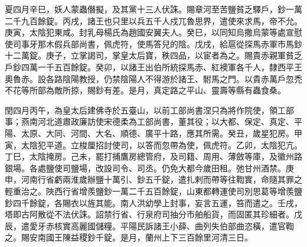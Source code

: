\begin{pinyinscope}
 夏四月辛巳，妖人蒙蟲僭擬，及其黨十三人伏誅。賜章河至苦鹽貧乏驛戶，鈔一萬二千九百餘錠。丙戌，諸王也只里以兵五千人戍兀魯思界，遣使來求馬，帝不允。庚寅，太陰犯東咸。封乳母楊氏為趙國安翼夫人。癸巳，以同知烏撒烏蒙等處宣慰使司事牙那木假兵部尚書，佩虎符，使馬答兒的陰。戊戌，給扈從探馬赤軍市馬鈔十二萬錠。庚子，立掌謁司，掌皇太后寶，秩四品，以宦者為之。賜貴赤親軍貧乏戶鈔四萬一千五百餘錠。癸卯，以諸王出伯所統探馬赤、紅襖軍各千人，隸西平王奧魯赤。設各路陰陽教授，仍禁陰陽人不得游於諸王、駙馬之門。以貴赤萬戶忽禿不花等所部為敵所掠，賜鈔有差。是月，真定路之平山、靈壽等縣有蟲食桑。



 閏四月丙午，為皇太后建佛寺於五臺山，以前工部尚書涅只為將作院使，領工部事；燕南河北道肅政廉訪使宋德柔為工部尚書，董其役；以大都、保定、真定、平陽、太原、大同、河間、大名、順德、廣平十路，應其所需。癸丑，歲星犯房。甲寅，太陰犯平道。立梭厘招討使司，以答而忽帶為使，佩虎符。乙卯，太陰犯亢。丁巳，太陰掩房。己未，罷打捕鷹房總管府，及司籍、周用、薄斂等庫，及徽州路銀場。各處鹽使司鹽場，改設司令、司丞。仍免大都今歲田租。弛甘州酒禁。庚申，河南行省虧兩淮歲辦鹽十萬引、鈔五千錠，遣扎剌而帶等往鞫實，命隨其罪之輕重治之。陜西行省增羨鹽鈔一萬二千五百餘錠，山東都轉運使司別思葛等增羨鹽鈔四千餘錠，各賜衣以旌其能。南人洪幼學上封事，妄言五運，笞而遣之。壬戌，塔即古阿散從不法伏誅。詔禁行省、行泉府司抽分市舶船貨，而固匿其珍細者。戊辰，遣愛牙赤核實高麗國儲糧。平陽民訴諸王小薛、曲列失伯部曲恣橫，遣官鞫之。賜安南國王陳益稷鈔千錠。是月，蘭州上下三百餘里河清三日。




\end{pinyinscope}
